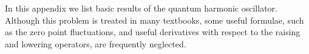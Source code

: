 In this appendix we list basic results of the quantum harmonic oscillator. Although this problem is treated in many textbooks, some useful formulae, such as the zero point fluctuations, and useful derivatives with respect to the raising and lowering operators, are frequently neglected.

